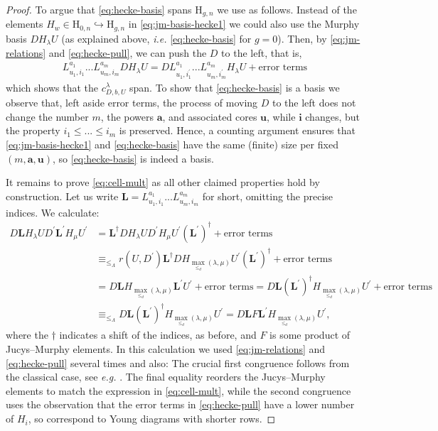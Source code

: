 \documentclass[a4paper,11pt]{amsart}
\newcommand{\ie}{\textsl{i.e.}}
\newcommand{\eg}{\textsl{e.g.}}
\renewcommand{\dots}{\text{...}}
\newcommand{\setstuff}[1]{\mathrm{#1}}
\newcommand{\bsym}[1]{\boldsymbol{#1}}
\newcommand{\jm}{L}
\numberwithin{equation}{section}
\begin{document}
\begin{proof}
To argue that \eqref{eq:hecke-basis} spans
$\setstuff{H}_{g,n}$ we use \cite[Proposition 3.16]{Ma-hecke-schur} as follows.
Instead of the elements $H_{w}\in\setstuff{H}_{0,n}\hookrightarrow
\setstuff{H}_{g,n}$ in \eqref{eq:jm-basis-hecke1} we could 
also use the Murphy basis $DH_{\lambda}U$ (as explained above, {\ie} 
\eqref{eq:hecke-basis} for $g=0$). Then, by 
\eqref{eq:jm-relations} and \eqref{eq:hecke-pull}, we can push 
the $D$ to the left, that is, 
\begin{gather*}
\jm_{u_{1}^{},i_{1}}^{a_{1}}\dots 
\jm_{u_{m},i_{m}}^{a_{m}}DH_{\lambda}U
=D\jm_{u_{1},i_{1}^{\prime}}^{a_{1}}\dots 
\jm_{u_{m},i_{m}^{\prime}}^{a_{m}}H_{\lambda}U+\text{error terms}
\end{gather*} 
which shows that the $c_{D,b,U}^{\lambda}$ span.
To show that \eqref{eq:hecke-basis} is a basis we observe that,
left aside error terms, the process of moving $D$ to the left 
does not change the number $m$, 
the powers $\bsym{a}$, and associated cores $\bsym{u}$, while 
$\bsym{i}$ changes, but the property 
$i_{1}\leq\dots\leq i_{m}$ is preserved. Hence, 
a counting argument ensures that \eqref{eq:jm-basis-hecke1} and 
\eqref{eq:hecke-basis} have the same (finite) size per fixed 
$(m,\bsym{a},\bsym{u})$, 
so \eqref{eq:hecke-basis} is indeed a basis.

It remains to prove \eqref{eq:cell-mult} as all other claimed 
properties hold by construction. Let us write 
$\bsym{L}=\jm_{u_{1},i_{1}}^{a_{1}}\dots 
\jm_{u_{m},i_{m}}^{a_{m}}$ for short, omitting the precise indices.
We calculate: 
\begin{align*}
D\bsym{L}H_{\lambda}U
D^{\prime}\bsym{L}^{\prime}H_{\mu}U^{\prime}
&=
\bsym{L}^{\dagger}DH_{\lambda}U
D^{\prime}H_{\mu}U^{\prime}(\bsym{L}^{\prime})^{\dagger}
+\text{error terms}
\\
&\equiv_{\leq_{\Lambda}}
r(U,D^{\prime})
\bsym{L}^{\dagger}DH_{\max_{\leq_{d}}(\lambda,\mu)}
U^{\prime}(\bsym{L}^{\prime})^{\dagger}
+\text{error terms}
\\
&=
D\bsym{L}H_{\max_{\leq_{d}}(\lambda,\mu)}
\bsym{L}^{\prime}U^{\prime}
+\text{error terms}
=
D\bsym{L}
(\bsym{L}^{\prime})^{\dagger}H_{\max_{\leq_{d}}(\lambda,\mu)}U^{\prime}
+\text{error terms}
\\
&\equiv_{\leq_{\Lambda}}
D\bsym{L}
(\bsym{L}^{\prime})^{\dagger}H_{\max_{\leq_{d}}(\lambda,\mu)}U^{\prime}
=
D\bsym{L}
F\bsym{L}^{\prime}H_{\max_{\leq_{d}}(\lambda,\mu)}U^{\prime}
,
\end{align*}
where the $\dagger$ indicates
a shift of the indices, as before, and $F$ 
is some product of Jucys--Murphy elements. 
In this calculation we used 
\eqref{eq:jm-relations} 
and \eqref{eq:hecke-pull} several times and also:
The crucial first congruence 
follows from the classical case, see {\eg} \cite[Theorem 3.20]{Ma-hecke-schur}.
The final equality reorders the 
Jucys--Murphy elements to match the expression in 
\eqref{eq:cell-mult}, while the second congruence uses 
the observation that the error terms in \eqref{eq:hecke-pull} 
have a lower number of $H_{i}$, so correspond to Young diagrams with shorter rows.
\end{proof} 
\end{document}
